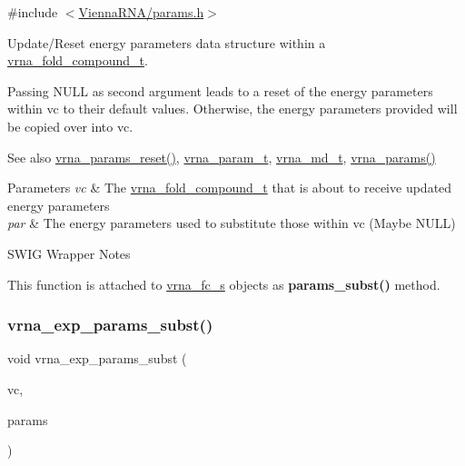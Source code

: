 {\ttfamily \#include $<$\mbox{\hyperlink{params_8h}{Vienna\+R\+N\+A/params.\+h}}$>$}



Update/\+Reset energy parameters data structure within a \mbox{\hyperlink{group__fold__compound_ga1b0cef17fd40466cef5968eaeeff6166}{vrna\+\_\+fold\+\_\+compound\+\_\+t}}. 

Passing N\+U\+LL as second argument leads to a reset of the energy parameters within vc to their default values. Otherwise, the energy parameters provided will be copied over into vc.

\begin{DoxySeeAlso}{See also}
\mbox{\hyperlink{group__energy__parameters_gac40dc82e48a72a97cfc58b9da08a7792}{vrna\+\_\+params\+\_\+reset()}}, \mbox{\hyperlink{group__energy__parameters_ga8a69ca7d787e4fd6079914f5343a1f35}{vrna\+\_\+param\+\_\+t}}, \mbox{\hyperlink{group__model__details_ga1f8a10e12a0a1915f2a4eff0b28ea17c}{vrna\+\_\+md\+\_\+t}}, \mbox{\hyperlink{group__energy__parameters_gad0e3e7e74bdc50d1709d40c92993185e}{vrna\+\_\+params()}}
\end{DoxySeeAlso}

\begin{DoxyParams}{Parameters}
{\em vc} & The \mbox{\hyperlink{group__fold__compound_ga1b0cef17fd40466cef5968eaeeff6166}{vrna\+\_\+fold\+\_\+compound\+\_\+t}} that is about to receive updated energy parameters \\
\hline
{\em par} & The energy parameters used to substitute those within vc (Maybe N\+U\+LL)\\
\hline
\end{DoxyParams}
\begin{DoxyRefDesc}{S\+W\+I\+G Wrapper Notes}
\item[\mbox{\hyperlink{wrappers__wrappers000079}{S\+W\+I\+G Wrapper Notes}}]This function is attached to \mbox{\hyperlink{group__fold__compound_structvrna__fc__s}{vrna\+\_\+fc\+\_\+s}} objects as {\bfseries params\+\_\+subst()} method. \end{DoxyRefDesc}
\mbox{\label{group__energy__parameters_ga8e7ac4fab3b0cc03afbc134eaafb3525}} 
\subsubsection{\texorpdfstring{vrna\+\_\+exp\+\_\+params\+\_\+subst()}{vrna\_exp\_params\_subst()}}
{\footnotesize\ttfamily void vrna\+\_\+exp\+\_\+params\+\_\+subst (\begin{DoxyParamCaption}\item[{\mbox{\hyperlink{group__fold__compound_ga1b0cef17fd40466cef5968eaeeff6166}{vrna\+\_\+fold\+\_\+compound\+\_\+t}} $\ast$}]{vc,  }\item[{\mbox{\hyperlink{group__energy__parameters_ga01d8b92fe734df8d79a6169482c7d8d8}{vrna\+\_\+exp\+\_\+param\+\_\+t}} $\ast$}]{params }\end{DoxyParamCaption})}



